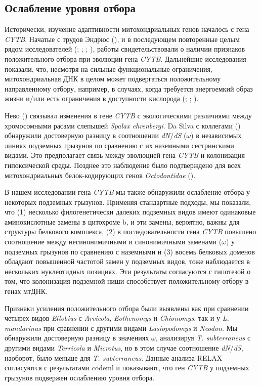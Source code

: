 \subsection{Ослабление уровня отбора}

Исторически, изучение адаптивности митохондриальных генов началось с гена \textit{CYTB}. Начатые с трудов Эндрюс (\cite{Andrews1998}), и в последующем повторенные целым рядом исследователей (\cite{Tomasco2014}; \cite{DaSilva2009}; \cite{DiRocco2006}; \cite{Shao2015}), работы свидетельствовали о наличии признаков положительного отбора при эволюции гена \textit{CYTB}. Дальнейшие исследования показали, что, несмотря на сильные функциональные ограничения, митохондриальная ДНК в целом может подвергаться положительному направленному отбору, например, в случаях, когда требуется энергоемкий образ жизни и/или есть ограничения в доступности кислорода (\cite{Tomasco2011}; \cite{Shen2010}; \cite{Blier2001}).

Нево (\cite{Nevo1999}) связывал изменения в гене \textit{CYTB} с экологическими различиями между хромосомными расами слепышей \textit{Spalax ehrenbergi}. Da Silva с коллегами (\cite{DaSilva2009}) обнаружили достоверную разницу в соотношении \textit{dN}/\textit{dS} ($\omega$) в независимых линиях подземных грызунов по сравнению с их наземными сестринскими видами. Это предполагает связь между эволюцией гена \textit{CYTB} и колонизация гипоксической среды. Позднее это наблюдение было подтверждено для всех митохондриальных белок-кодирующих генов \textit{Octodontidae} (\cite{Tomasco2011}).

В нашем исследовании гена \textit{CYTB} мы также обнаружили ослабление отбора у некоторых подземных грызунов. Применяя стандартные подходы, мы показали, что (1) несколько филогенетически далеких подземных видов имеют одинаковые аминокислотные замены в цитохроме b, и эти замены, вероятно, важны для структуры белкового комплекса, (2) в последовательности гена \textit{CYTB} повышено соотношение между несинонимичными и синонимичными заменами ($\omega$) у подземных грызунов по сравнению с наземными и (3) восемь белковых доменов обладают повышенной частотой замен у подземных видов, тоже наблюдается в нескольких нуклеотидных позициях. Эти результаты согласуются с гипотезой о том, что колонизация подземной ниши способствует положительному отбору в генах мтДНК.

Признаки усиления положительного отбора были выявлены как при сравнении четырех видов \textit{Ellobius} с \textit{Arvicola}, \textit{Eothenomys} и \textit{Chionomys}, так и у \textit{L. mandarinus} при сравнении с другими видами \textit{Lasiopodomys} и \textit{Neodon}. Мы обнаружили достоверную разницу в значениях $\omega$, анализируя \textit{T. subterraneus} с другими видами \textit{Terricola} и \textit{Microtus}, но в этом случае соотношение \textit{dN}/\textit{dS}, наоборот, было меньше для \textit{T. subterraneus}. Данные анализа RELAX согласуются с результатами codeml и показывают, что ген \textit{CYTB} у подземных грызунов подвержен ослаблению уровня отбора.


